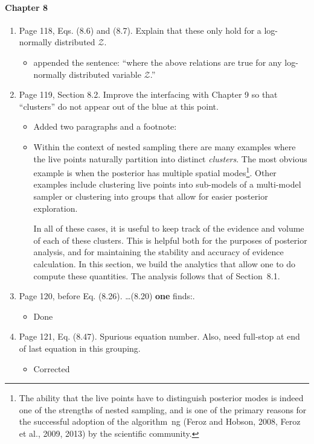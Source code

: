 \documentclass[11pt]{article}
\begin{document}
\paragraph{Chapter 8}
\begin{enumerate}
\item Page 118, Eqs. (8.6) and (8.7). Explain that these only hold for
  a log-normally distributed $\mathcal{Z}$.
  \begin{itemize}
      \item appended the sentence: ``where the above relations are true for any log-normally distributed variable \(\mathcal{Z}\).''
  \end{itemize}
\item Page 119, Section 8.2. Improve the interfacing with Chapter 9 so
  that ``clusters'' do not appear out of the blue at this point.
  \begin{itemize}
      \item Added two paragraphs and a footnote:
      \item Within the context of nested sampling there are many examples where the live points naturally partition into distinct {\em clusters}. The most obvious example is when the posterior has multiple spatial modes\footnote{The ability that the live points have to distinguish posterior modes is indeed one of the strengths of nested sampling, and is one of the primary reasons for the successful adoption of the \MultiNest{} algorithm~ng (Feroz and Hobson, 2008, Feroz et al., 2009, 2013) by the scientific community.}. Other examples include clustering live points into sub-models of a multi-model sampler or clustering into groups that allow for easier posterior exploration.

          In all of these cases, it is useful to keep track of the evidence and volume of each of these clusters. This is helpful both for the purposes of posterior analysis, and for maintaining the stability and accuracy of evidence calculation. In this section, we build the analytics that allow one to do compute these quantities. The analysis follows that of Section~8.1.
  \end{itemize}
\item Page 120, before Eq. (8.26).  \ldots (8.20) \textbf{one} finds:.
    \begin{itemize}
        \item Done
    \end{itemize}
\item Page 121, Eq. (8.47). Spurious equation number. Also, need
  full-stop at end of last equation in this grouping.
  \begin{itemize}
      \item Corrected
  \end{itemize}
\end{enumerate}
\end{document}
